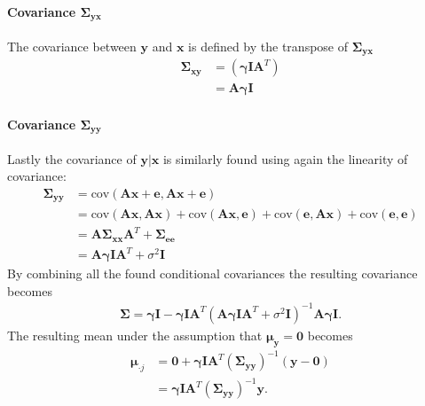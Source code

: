 \paragraph{Covariance $\boldsymbol{\Sigma}_{\mathbf{yx}}$}
The covariance between $\mathbf{y}$ and $\mathbf{x}$ is defined by the transpose of $\boldsymbol{\Sigma}_{\mathbf{yx}}$
\begin{align*}
\boldsymbol{\Sigma}_{\mathbf{xy}} &= \left( \boldsymbol{\gamma} \mathbf{I} \mathbf{A}^T\right)\\
&= \textbf{A}\boldsymbol{\gamma}\mathbf{I}
\end{align*}

\paragraph{Covariance $\boldsymbol{\Sigma}_{\mathbf{yy}}$}
Lastly the covariance of $\mathbf{y} \vert \mathbf{x}$ is similarly found using again the linearity of covariance:
\begin{align*}
\boldsymbol{\Sigma}_{\mathbf{yy}} &= \text{cov} \left(\mathbf{Ax} + \mathbf{e} , \mathbf{Ax} + \mathbf{e} \right) \\ 
&= \text{cov}\left( \mathbf{Ax},\mathbf{Ax} \right) + \text{cov}\left(\mathbf{Ax},  \mathbf{e} \right) + \text{cov}\left( \mathbf{e}, \mathbf{Ax} \right) + \text{cov}\left( \mathbf{e}, \mathbf{e} \right)\\
&= \textbf{A}\boldsymbol{\Sigma}_{\mathbf{xx}}\textbf{A}^T + \boldsymbol{\Sigma}_{\mathbf{ee}} \\
&= \textbf{A}\boldsymbol{\gamma} \mathbf{I}\textbf{A}^T + \sigma^2 \mathbf{I}
\end{align*} 
By combining all the found conditional covariances the resulting covariance becomes 
\begin{align*}
\boldsymbol{\Sigma} = \boldsymbol{\gamma} \mathbf{I} - \boldsymbol{\gamma} \mathbf{I} \mathbf{A}^T (\textbf{A}\boldsymbol{\gamma} \mathbf{I}\textbf{A}^T + \sigma^2 \mathbf{I})^{-1} \mathbf{A} \boldsymbol{\gamma} \mathbf{I}.
\end{align*}
The resulting mean under the assumption that $\boldsymbol{\mu}_{\mathbf{y}} = \mathbf{0}$ becomes
\begin{align*}
\boldsymbol{\mu}_{\cdot j} &= \mathbf{0} + \boldsymbol{\gamma} \mathbf{I} \mathbf{A}^T \left( \boldsymbol{\Sigma}_{\mathbf{yy}} \right)^{-1} \left(\mathbf{y} - \mathbf{0}\right) \\
&= \boldsymbol{\gamma} \mathbf{I} \mathbf{A}^T \left( \boldsymbol{\Sigma}_{\mathbf{yy}} \right)^{-1} \mathbf{y}.
\end{align*}  
